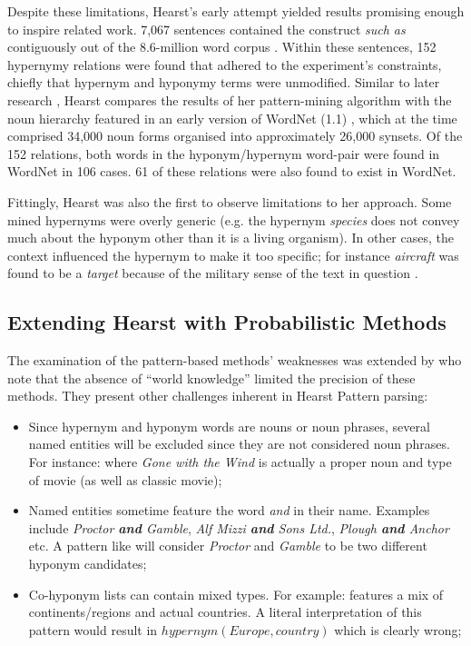 Despite these limitations, Hearst’s early attempt yielded results promising enough to inspire related work.  7,067 sentences contained the construct \textit{such as} contiguously out of the 8.6-million word corpus \citep{grolier1990academic}.  Within these sentences, 152 hypernymy relations were found that adhered to the experiment’s constraints, chiefly that hypernym and hyponymy terms were unmodified.  Similar to later research \citep{kozareva2010semi}, Hearst compares the results of her pattern-mining algorithm with the noun hierarchy featured in an early version of WordNet (1.1) \citep{Miller1995}, which at the time comprised 34,000 noun forms organised into approximately 26,000 \ac{synset}s.  Of the 152 relations, both words in the hyponym/hypernym word-pair were found in WordNet in 106 cases.  61 of these relations were also found to exist in WordNet.  

Fittingly, Hearst was also the first to observe limitations to her approach.  Some mined hypernyms were overly generic (e.g. the hypernym \textit{species} does not convey much about the hyponym other than it is a living organism).  In other cases, the context influenced the hypernym to make it too specific; for instance \textit{aircraft} was found to be a \textit{target} because of the military sense of the text in question \citep{hearst1992automatic}.

\subsection{Extending Hearst with Probabilistic Methods} \label{sec:lit_probase}
The examination of the pattern-based methods' weaknesses was extended by \citet{Wang2017} who note that the absence of ``world knowledge'' limited the precision of these methods.   They present other challenges inherent in Hearst Pattern parsing:
\begin{itemize}
    \item Since hypernym and hyponym words are nouns or noun phrases, several named entities will be excluded since they are not considered noun phrases.  For instance:  where \textit{Gone with the Wind} is actually a proper noun and type of movie (as well as classic movie);
    \item Named entities sometime feature the word \textit{and} in their name.  Examples include \textit{Proctor \textbf{and} Gamble}, \textit{Alf Mizzi \textbf{and} Sons Ltd.}, \textit{Plough \textbf{and} Anchor} etc. A pattern like  will consider \textit{Proctor} and \textit{Gamble} to be two different hyponym candidates;
    \item Co-hyponym lists can contain mixed types.  For example:  features a mix of continents/regions and actual countries.  A literal interpretation of this pattern would result in \(hypernym(Europe, country)\) which is clearly wrong;
\end{itemize}

